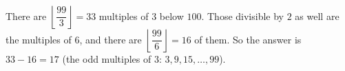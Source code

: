 There are $\left\lfloor\dfrac{99}{3}\right\rfloor=33$ multiples of $3$ below $100$. Those divisible by $2$ as well are the multiples of $6$, and there are $\left\lfloor\dfrac{99}{6}\right\rfloor=16$ of them. So the answer is $33-16=\boxed{17}$ (the odd multiples of $3$: $3,9,15,\dots,99$).
